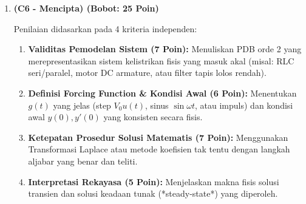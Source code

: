 \documentclass[11pt,a4paper]{article}
\begin{document}
\begin{enumerate}[label=\textbf{Soal \arabic*.}]
    \item \textbf{(C6 - Mencipta) (Bobot: 25 Poin)}
    \begin{tcolorbox}[colback=green!5!white,colframe=green!60!black,title=Rubrik Penilaian Desain Sistem:]
    Penilaian didasarkan pada 4 kriteria independen:
    \begin{enumerate}
        \item \textbf{Validitas Pemodelan Sistem (7 Poin):} Menuliskan PDB orde 2 yang merepresentasikan sistem kelistrikan fisis yang masuk akal (misal: RLC seri/paralel, motor DC armature, atau filter tapis lolos rendah).
        \item \textbf{Definisi Forcing Function \& Kondisi Awal (6 Poin):} Menentukan $g(t)$ yang jelas (step $V_0 u(t)$, sinus $\sin\omega t$, atau impuls) dan kondisi awal $y(0), y'(0)$ yang konsisten secara fisis.
        \item \textbf{Ketepatan Prosedur Solusi Matematis (7 Poin):} Menggunakan Transformasi Laplace atau metode koefisien tak tentu dengan langkah aljabar yang benar dan teliti.
        \item \textbf{Interpretasi Rekayasa (5 Poin):} Menjelaskan makna fisis solusi transien dan solusi keadaan tunak (*steady-state*) yang diperoleh.
    \end{enumerate}
    \end{tcolorbox}
\end{enumerate}
\end{document}
